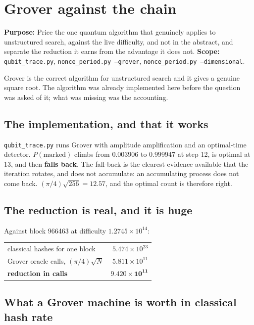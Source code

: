
\chapter{Grover against the chain}

\textbf{Purpose:} Price the one quantum algorithm that genuinely applies to unstructured search,
against the live difficulty, and not in the abstract, and separate the reduction it earns from
the advantage it does not. \textbf{Scope:} \texttt{qubit\_trace.py},
\texttt{nonce\_period.py --grover}, \texttt{nonce\_period.py --dimensional}.

Grover is the correct algorithm for unstructured search and it gives a genuine square root. The
algorithm was already implemented here before the question was asked of it; what was missing was the
accounting.

\section{The implementation, and that it works}

\texttt{qubit\_trace.py} runs Grover with amplitude amplification and an optimal-time detector.
\(P(\text{marked})\) climbs from \(0.003906\) to \(0.999947\) at step 12, is optimal at 13, and then
\textbf{falls back}. The fall-back is the clearest evidence available that the iteration
rotates, and does not accumulate: an accumulating process does not come back.
\((\pi/4)\sqrt{256} = 12.57\), and the optimal count is therefore right.

\section{The reduction is real, and it is huge}

Against block 966463 at difficulty \(1.2745 \times 10^{14}\):

\begin{center}
\begin{tabular}{lr}
\toprule
classical hashes for one block & \(5.474 \times 10^{23}\) \\
Grover oracle calls, \((\pi/4)\sqrt{N}\) & \(5.811 \times 10^{11}\) \\
\textbf{reduction in calls} & \(\mathbf{9.420 \times 10^{11}}\) \\
\bottomrule
\end{tabular}
\end{center}

\section{What a Grover machine is worth in classical hash rate}

